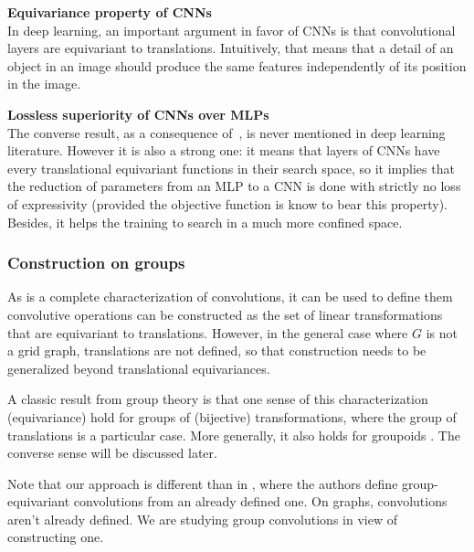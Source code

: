 \begin{remark}\textbf{Equivariance property of CNNs}\\
In deep learning, an important argument in favor of CNNs is that convolutional layers are equivariant to translations. Intuitively, that means that a detail of an object in an image should produce the same features independently of its position in the image.
\end{remark}

\begin{remark}\textbf{Lossless superiority of CNNs over MLPs}\\
The converse result, as a consequence of~, is never mentioned in deep learning literature. However it is also a strong one: it means that layers of CNNs have every translational equivariant functions in their search space, so it implies that the reduction of parameters from an MLP to a CNN is done with strictly no loss of expressivity (provided the objective function is know to bear this property). Besides, it helps the training to search in a much more confined space.
\end{remark}

\subsubsection{Construction on groups}

As  is a complete characterization of convolutions, it can be used to define them \ie convolutive operations can be constructed as the set of linear transformations that are equivariant to translations. However, in the general case where $G$ is not a grid graph, translations are not defined, so that construction needs to be generalized beyond translational equivariances.

A classic result from group theory is that one sense of this characterization (equivariance) hold for groups of (bijective) transformations, where the group of translations is a particular case. More generally, it also holds for groupoids \citep{weinstein1996groupoids}. The converse sense will be discussed later.

Note that our approach is different than in \citep{cohen2016group}, where the authors define group-equivariant convolutions from an already defined one. On graphs, convolutions aren't already defined. We are studying group convolutions in view of constructing one.

